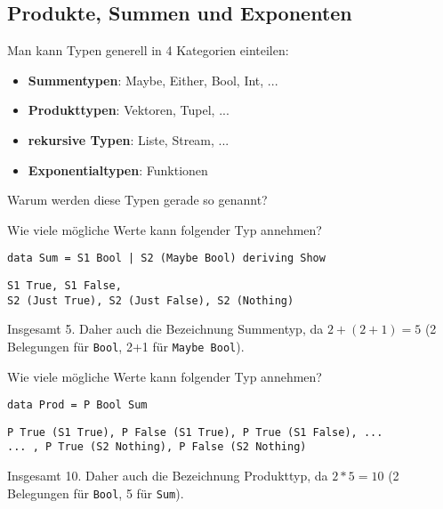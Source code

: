 \documentclass{beamer}
\begin{document}
\subsection{Produkte, Summen und Exponenten}
\begin{frame}[fragile]
Man kann Typen generell in 4 Kategorien einteilen: \bigskip

\pause
\begin{itemize}
 \item \textbf{Summentypen}: Maybe, Either, Bool, Int, ... \pause
 \item \textbf{Produkttypen}: Vektoren, Tupel, ... \pause
 \item \textbf{rekursive Typen}: Liste, Stream, ... \pause
 \item \textbf{Exponentialtypen}: Funktionen \pause
\end{itemize} \bigskip

Warum werden diese Typen gerade so genannt?
\end{frame}

\begin{frame}[fragile]
Wie viele mögliche Werte kann folgender Typ annehmen?
\begin{verbatim}
data Sum = S1 Bool | S2 (Maybe Bool) deriving Show
\end{verbatim}
\bigskip

\pause
\begin{verbatim}
S1 True, S1 False,
S2 (Just True), S2 (Just False), S2 (Nothing)
\end{verbatim}
\pause
\bigskip

Insgesamt 5. Daher auch die Bezeichnung Summentyp, da $2+(2+1) = 5$ (2 Belegungen für \texttt{Bool}, 2+1 für \texttt{Maybe Bool}).
\end{frame}

\begin{frame}[fragile]
Wie viele mögliche Werte kann folgender Typ annehmen?
\begin{verbatim}
data Prod = P Bool Sum
\end{verbatim}
\pause
\bigskip

\begin{verbatim}
P True (S1 True), P False (S1 True), P True (S1 False), ...
... , P True (S2 Nothing), P False (S2 Nothing)
\end{verbatim}
\pause
\bigskip

Insgesamt 10. Daher auch die Bezeichnung Produkttyp, da $2*5 = 10$ (2 Belegungen für \texttt{Bool}, 5 für \texttt{Sum}).
\end{frame}
\end{document}
